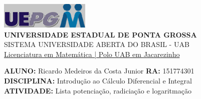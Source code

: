 \documentclass[a4paper, 12pt]{article}
\begin{document}
\begin{flushleft}\includegraphics{logo}\\
\textbf{UNIVERSIDADE ESTADUAL DE PONTA GROSSA} \\
SISTEMA UNIVERSIDADE ABERTA DO BRASIL - UAB \\
\underline{Licenciatura em Matemática | Polo UAB em Jacarezinho}\end{flushleft} 
\textbf{ALUNO:} Ricardo Medeiros da Costa Junior   \textbf{RA:} 151774301 \\
\textbf{DISCIPLINA:} Introdução ao Cálculo Diferencial e Integral \\
\textbf{ATIVIDADE:} Lista potenciação, radiciação e logaritmação \\ \\
\end{document}
